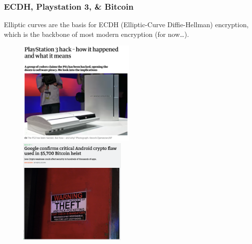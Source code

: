 \begin{frame}[plain] \frametitle{ECDH, Playstation 3, \& Bitcoin} \footnotesize
Elliptic curves are the basis for ECDH (Elliptic-Curve Diffie-Hellman) encryption, which is the backbone of most modern encryption (for now\dots). 
	\begin{figure}[h]
	\centering
	\includegraphics[width=0.515\textwidth]{images/playstation.png}
	\includegraphics[width=0.475\textwidth]{images/bitcoin.png}
	\end{figure}
\end{frame}




